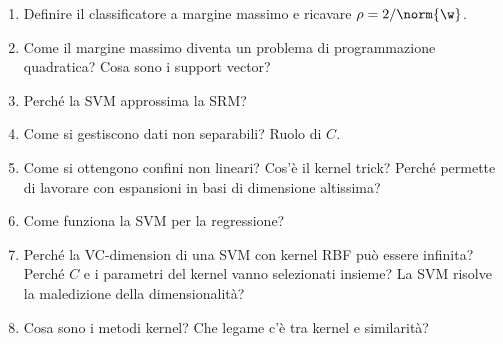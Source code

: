 \begin{domande}
\begin{enumerate}
  \item Definire il classificatore a margine massimo e ricavare $\rho = 2/\norm{\w}$.
  \item Come il margine massimo diventa un problema di programmazione quadratica? Cosa sono i support vector?
  \item Perché la SVM approssima la SRM?
  \item Come si gestiscono dati non separabili? Ruolo di $C$.
  \item Come si ottengono confini non lineari? Cos'è il kernel trick? Perché permette di lavorare con espansioni in
        basi di dimensione altissima?
  \item Come funziona la SVM per la regressione?
  \item Perché la VC-dimension di una SVM con kernel RBF può essere infinita? Perché $C$ e i parametri del kernel vanno
        selezionati insieme? La SVM risolve la maledizione della dimensionalità?
  \item Cosa sono i metodi kernel? Che legame c'è tra kernel e similarità?
\end{enumerate}
\end{domande}
